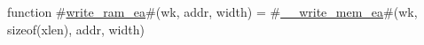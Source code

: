 function #\hyperref[sailRISCVzwritezyramzyea]{write\_ram\_ea}#(wk, addr, width) =
  #\hyperref[sailRISCVzzyzywritezymemzyea]{\_\_write\_mem\_ea}#(wk, sizeof(xlen), addr, width)
